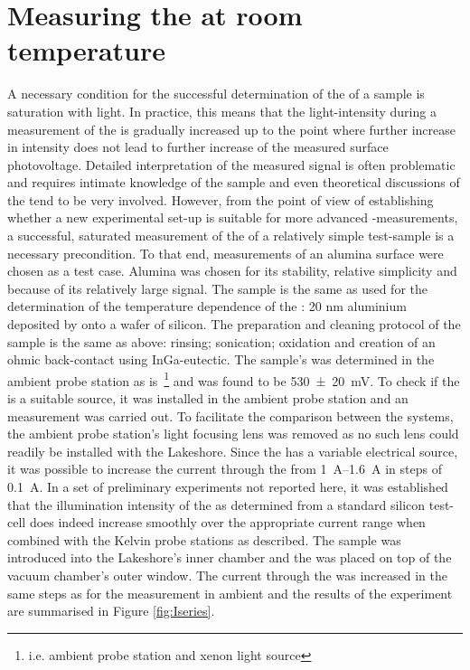 \section{Measuring the \spv{} at room temperature}
A necessary condition for the successful determination of the \spv{} of a sample is saturation with light. In practice, this means that the light-intensity during a measurement of the \spv{} is gradually increased up to the point where further increase in intensity does not lead to further increase of the measured surface photovoltage. Detailed interpretation of the measured signal is often problematic and requires intimate knowledge of the sample and even theoretical discussions of the \spv{} tend to be very involved. However, from the point of view of establishing whether a new experimental set-up is suitable for more advanced \spv{}-measurements, a successful, saturated measurement of the \spv{} of a relatively simple test-sample is a necessary precondition. To that end, \spv{} measurements of an alumina surface were chosen as a test case. Alumina was chosen for its stability, relative simplicity and because of its relatively large \spv{} signal. The sample is the same as used for the determination of the temperature dependence of the \cpd{}: 20 nm aluminium deposited by \ald{} onto a wafer of silicon. The preparation and cleaning protocol of the sample is the same as above: rinsing; sonication; oxidation and creation of an ohmic back-contact using InGa-eutectic. The sample's \spv{} was determined in the ambient probe station as is~\footnote{i.e. ambient probe station and xenon light source} and was found to be \SI{530+-20}{\milli\volt}. To check if the \led{} is a suitable source, it was installed in the ambient probe station and an \spv{} measurement was carried out. To facilitate the comparison between the systems, the ambient probe station's light focusing lens was removed as no such lens could readily be installed with the Lakeshore. Since the \led{} has a variable electrical source, it was possible to increase the current through the \led{} from \SIrange{1}{1.6}{\ampere} in steps of \SI{0.1}{\ampere}. In a set of preliminary experiments not reported here, it was established that the illumination intensity of the \led{} as determined from a standard silicon test-cell does indeed increase smoothly over the appropriate current range when combined with the Kelvin probe stations as described. The sample was introduced into the Lakeshore's inner chamber and the \led{} was placed on top of the vacuum chamber's outer window. The current through the \led{} was increased in the same steps as for the measurement in ambient and the results of the experiment are summarised in Figure \ref{fig:Iseries}.
